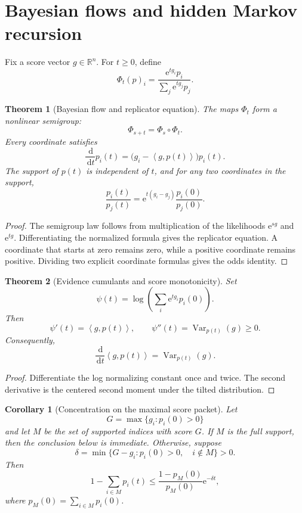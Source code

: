 \documentclass[11pt,letterpaper]{article}
\newtheorem{theorem}{Theorem}[section]
\theoremstyle{plain}
\theoremstyle{plain}
\theoremstyle{plain}
\newtheorem{corollary}[corollary]{Corollary}
\theoremstyle{definition}
\theoremstyle{definition}
\theoremstyle{definition}
\theoremstyle{definition}
\theoremstyle{definition}
\theoremstyle{remark}
\theoremstyle{remark}
\theoremstyle{remark}
\theoremstyle{remark}
\theoremstyle{remark}
\newcommand{\Var}{\operatorname{Var}}
\theoremstyle{remark}
\newcommand{\RR}{\mathbb R}
\newcommand{\e}{\mathrm e}
\newcommand{\dd}{\,\mathrm d}
\newcommand{\ip}[2]{\left\langle#1,#2\right\rangle}
\let\KomorebiPrimitivemathbb\mathbb
\renewcommand{\mathbb}[1]{{\KomorebiPrimitivemathbb{#1}}}
\let\KomorebiPrimitivemathrm\mathrm
\renewcommand{\mathrm}[1]{{\KomorebiPrimitivemathrm{#1}}}
\begin{document}
\FloatBarrier
\section{Bayesian flows and hidden Markov recursion}\label{extended:section:10}\label{extended:sec:bayesian_flows}

Fix a score vector \(g\in\RR^n\). For \(t\geq0\), define
\[
\Phi_t(p)_i
=
\frac{\e^{tg_i}p_i}
{\sum_j\e^{tg_j}p_j}.
\]

\begin{theorem}[Bayesian flow and replicator equation]\label{extended:record:061}\label{extended:thm:bayesian_flow}
The maps \(\Phi_t\) form a nonlinear semigroup:
\[
\Phi_{s+t}=\Phi_s\circ\Phi_t.
\]
Every coordinate satisfies
\[
\frac{\dd}{\dd t}p_i(t)
=
\bigl(g_i-\ip{g}{p(t)}\bigr)p_i(t).
\]
The support of \(p(t)\) is independent of \(t\), and for any two coordinates in the support,
\[
\frac{p_i(t)}{p_j(t)}
=
\e^{t(g_i-g_j)}
\frac{p_i(0)}{p_j(0)}.
\]
\end{theorem}

\begin{proof}
The semigroup law follows from multiplication of the likelihoods \(\e^{sg}\) and \(\e^{tg}\). Differentiating the normalized formula gives the replicator equation. A coordinate that starts at zero remains zero, while a positive coordinate remains positive. Dividing two explicit coordinate formulas gives the odds identity.
\end{proof}

\begin{theorem}[Evidence cumulants and score monotonicity]\label{extended:record:062}\label{extended:thm:evidence_cumulants}
Set
\[
\psi(t)
=
\log\left(
\sum_i\e^{tg_i}p_i(0)
\right).
\]
Then
\[
\psi'(t)=\ip{g}{p(t)},
\qquad
\psi''(t)=\Var_{p(t)}(g)\geq0.
\]
Consequently,
\[
\frac{\dd}{\dd t}\ip{g}{p(t)}
=
\Var_{p(t)}(g).
\]
\end{theorem}

\begin{proof}
Differentiate the log normalizing constant once and twice. The second derivative is the centered second moment under the tilted distribution.
\end{proof}

\begin{corollary}[Concentration on the maximal score packet]\label{extended:record:063}\label{extended:cor:bayes_flow_concentration}
Let
\[
G=\max\{g_i:p_i(0)>0\}
\]
and let \(M\) be the set of supported indices with score \(G\). If \(M\) is the full support, then the conclusion below is immediate. Otherwise, suppose
\[
\delta
=
\min\{G-g_i:p_i(0)>0,
\quad i\notin M\}>0.
\]
Then
\[
1-\sum_{i\in M}p_i(t)
\leq
\frac{1-p_M(0)}{p_M(0)}\e^{-\delta t},
\]
where \(p_M(0)=\sum_{i\in M}p_i(0)\).
\end{corollary}
\end{document}
